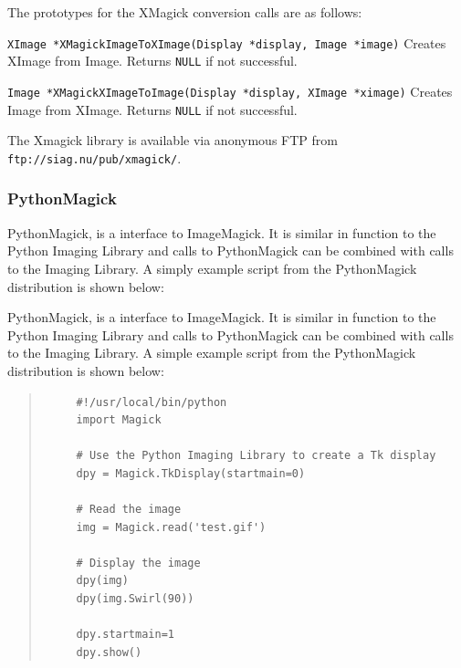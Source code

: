 \documentclass[twoside,11pt]{article}
\newcommand{\htmladdnormallink}[2]{#1}
\newcommand{\htmlref}[2]{#1}
\begin{document}
The prototypes for the XMagick conversion calls are as follows:

\begin{description}
\item {\tt XImage *XMagickImageToXImage(Display *display, Image *image)}\linebreak
Creates XImage from Image. Returns {\tt NULL} if not successful.
\item{\tt Image *XMagickXImageToImage(Display *display, XImage *ximage)}\linebreak
Creates Image from XImage. Returns {\tt NULL} if not successful.
\end{description}

The Xmagick library is available via anonymous FTP from
\htmladdnormallink{{\tt
ftp://siag.nu/pub/xmagick/}}{ftp://siag.nu/pub/xmagick/}.

\subsubsection{PythonMagick}

\htmladdnormallink{PythonMagick}{http://starship.python.net/crew/zack/pymagick/},
is a interface to \htmlref{ImageMagick}{sc15_magick}. It is similar in
function to the \htmlref{Python Imaging Library}{sc15_pythonimg} and
calls to PythonMagick can be combined with calls to the Imaging
Library. A simply example script from the PythonMagick distribution is
shown below:

PythonMagick, is a interface to \htmlref{ImageMagick}{sc15_magick}. It
is similar in function to the \htmlref{Python Imaging
Library}{sc15_pythonimg} and calls to PythonMagick can be combined
with calls to the Imaging Library. A simple example script from the
PythonMagick distribution is shown below:


\small
\begin{quote}
\begin{verbatim}
     #!/usr/local/bin/python
     import Magick

     # Use the Python Imaging Library to create a Tk display
     dpy = Magick.TkDisplay(startmain=0)

     # Read the image
     img = Magick.read('test.gif')

     # Display the image
     dpy(img)
     dpy(img.Swirl(90))

     dpy.startmain=1
     dpy.show()
\end{verbatim}
\end{quote}
\normalsize
\end{document}
